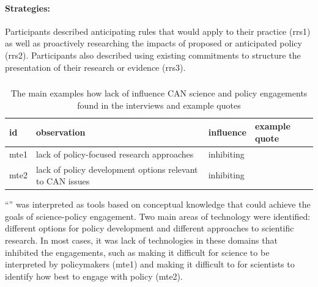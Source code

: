 \paragraph{Strategies:} Participants described anticipating rules that would apply to their practice (rrs1) as well as proactively researching the impacts of proposed or anticipated policy (rrs2). Participants also described using existing commitments to structure the presentation of their research or evidence (rrs3).

\subsubsection{\ismmt}\label{sec:restechnologies}



\begin{table}[!ht]
\footnotesize
\caption{The main examples how lack of \ismmt{} influence CAN science and policy engagements found in the interviews and example quotes}\label{tab:restechnologies}
\begin{tabular}{L{.06\linewidth}L{.3\linewidth}L{.12\linewidth}L{.52\linewidth}} \hline
\textbf{id} & \textbf{observation} & \textbf{influence} & \textbf{example quote} \\ \hline \hline 
mte1 & lack of policy-focused research approaches & inhibiting &  \\[5mm]
mte2 & lack of policy development options relevant to CAN issues & inhibiting &  \\[5mm]\hline
\end{tabular}
\end{table}
		
``\ismmt'' was interpreted as tools based on conceptual knowledge that could achieve the goals of science-policy engagement. Two main areas of technology were identified: different options for policy development and different approaches to scientific research. In most cases, it was lack of technologies in these domains that inhibited the engagements, such as making it difficult for science to be interpreted by policymakers (mte1) and making it difficult to for scientists to identify how best to engage with policy (mte2).

